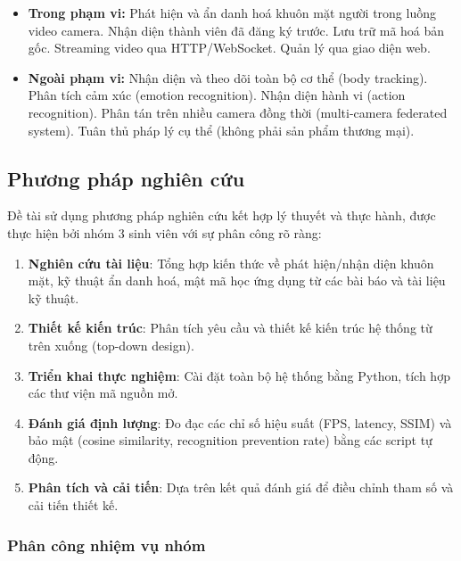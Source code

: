 \begin{itemize}
    \item \textbf{Trong phạm vi:} Phát hiện và ẩn danh hoá khuôn mặt người trong luồng video camera. Nhận diện thành viên đã đăng ký trước. Lưu trữ mã hoá bản gốc. Streaming video qua HTTP/WebSocket. Quản lý qua giao diện web.
    \item \textbf{Ngoài phạm vi:} Nhận diện và theo dõi toàn bộ cơ thể (body tracking). Phân tích cảm xúc (emotion recognition). Nhận diện hành vi (action recognition). Phân tán trên nhiều camera đồng thời (multi-camera federated system). Tuân thủ pháp lý cụ thể (không phải sản phẩm thương mại).
\end{itemize}

\subsection{Phương pháp nghiên cứu}
\label{subsec:phuongphap}

Đề tài sử dụng phương pháp nghiên cứu kết hợp lý thuyết và thực hành, được thực hiện bởi nhóm 3 sinh viên với sự phân công rõ ràng:

\begin{enumerate}[1.]
    \item \textbf{Nghiên cứu tài liệu}: Tổng hợp kiến thức về phát hiện/nhận diện khuôn mặt, kỹ thuật ẩn danh hoá, mật mã học ứng dụng từ các bài báo và tài liệu kỹ thuật.
    \item \textbf{Thiết kế kiến trúc}: Phân tích yêu cầu và thiết kế kiến trúc hệ thống từ trên xuống (top-down design).
    \item \textbf{Triển khai thực nghiệm}: Cài đặt toàn bộ hệ thống bằng Python, tích hợp các thư viện mã nguồn mở.
    \item \textbf{Đánh giá định lượng}: Đo đạc các chỉ số hiệu suất (FPS, latency, SSIM) và bảo mật (cosine similarity, recognition prevention rate) bằng các script tự động.
    \item \textbf{Phân tích và cải tiến}: Dựa trên kết quả đánh giá để điều chỉnh tham số và cải tiến thiết kế.
\end{enumerate}

\subsubsection{Phân công nhiệm vụ nhóm}
\label{subsubsec:phancong}

